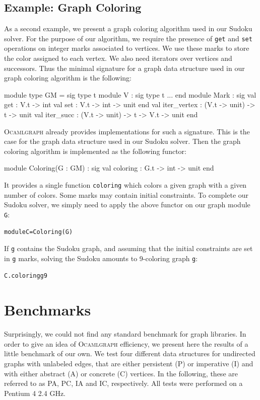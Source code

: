 \documentclass[tfpsymp,pagenumbers]{tfp07symp}
\newcommand{\ocamlgraph}{\textsc{Ocamlgraph}\xspace}
\begin{document}
\subsection{Example: Graph Coloring}
\label{coloring}

As a second example, we present a graph coloring algorithm used in our
Sudoku solver.
For the purpose of our
algorithm, we require the presence of \texttt{get} and \texttt{set}
operations on integer marks associated to vertices. We use these marks
to store the color assigned to each vertex. We also need iterators
over vertices and successors. Thus the minimal signature for a graph
data structure used in our graph coloring algorithm is the following:
\begin{ocaml}
module type GM = sig
  type t
  module V : sig type t ... end
  module Mark : sig
    val get : V.t -> int
    val set : V.t -> int -> unit
  end
  val iter_vertex : (V.t -> unit) -> t -> unit
  val iter_succ : (V.t -> unit) -> t -> V.t -> unit
end
\end{ocaml}
\ocamlgraph already provides implementations for such a
signature. This is the case for the graph data structure used in our
Sudoku solver.
Then the graph coloring algorithm is implemented as the following functor:
\begin{ocaml}
module Coloring(G : GM) : sig
  val coloring : G.t -> int -> unit
end
\end{ocaml}
It provides a single function \texttt{coloring} which colors a given
graph with a given number of colors. Some marks may contain initial
constraints. 
To complete our Sudoku solver, we simply need to apply the above
functor on our graph module \texttt{G}:
\begin{alltt}
module C = Coloring(G)
\end{alltt}
If \texttt{g} contains the Sudoku graph, and
assuming that the initial constraints are set in \texttt{g} marks, 
solving the Sudoku amounts to 9-coloring graph \texttt{g}:
\begin{alltt}
C.coloring g 9
\end{alltt}


\section{Benchmarks}\label{bench}

Surprisingly, we could not find any standard benchmark for graph
libraries. In order to give an idea of \ocamlgraph efficiency, we
present here the results of a little benchmark of our own.  We test
four different data structures for undirected graphs with unlabeled
edges, that are either persistent (P) or imperative (I) and with
either abstract (A) or concrete (C) vertices. In the following, these
are referred to as PA, PC, IA and IC, respectively.  All tests were
performed on a Pentium 4 2.4 GHz.
\end{document}
